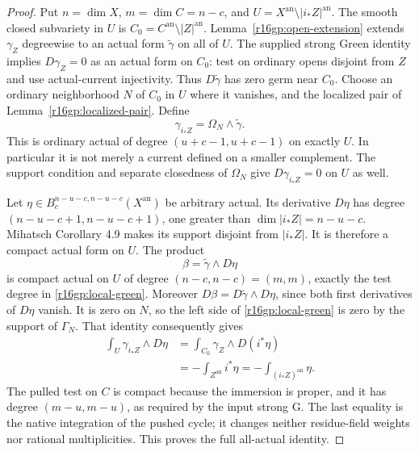\documentclass[11pt,a4paper]{article}
\theoremstyle{definition}
\theoremstyle{remark}
\numberwithin{equation}{section}
\begin{document}
\begin{proof}
Put $n=\dim X$, $m=\dim C=n-c$, and
$U=X^{\mathrm{an}}\setminus|i_*Z|^{\mathrm{an}}$.
The smooth closed subvariety in $U$ is
$C_0=C^{\mathrm{an}}\setminus|Z|^{\mathrm{an}}$.
Lemma~\ref{r16gp:open-extension} extends $\gamma_Z$ degreewise
to an actual form $\widetilde\gamma$ on all of $U$.
The supplied strong Green identity implies
$D\gamma_Z=0$ as an actual form on $C_0$: test on ordinary opens
disjoint from $Z$ and use actual-current injectivity.
Thus $D\widetilde\gamma$ has zero germ near $C_0$.
Choose an ordinary neighborhood $N$ of $C_0$ in $U$ where it
vanishes, and the localized pair of
Lemma~\ref{r16gp:localized-pair}.  Define
\[
                   \gamma_{i_*Z}=\Omega_N\wedge\widetilde\gamma.
 \tag{GP16.4}\label{r16gp:construction}
\]
This is ordinary actual of degree $(u+c-1,u+c-1)$ on exactly
$U$.  In particular it is not merely a current defined on a
smaller complement.  The support condition and separate closedness
of $\Omega_N$ give $D\gamma_{i_*Z}=0$ on $U$ as well.

Let $\eta\in B_c^{n-u-c,n-u-c}(X^{\mathrm{an}})$ be arbitrary
actual.  Its derivative $D\eta$ has degree
$(n-u-c+1,n-u-c+1)$, one greater than
$\dim|i_*Z|=n-u-c$.  Mihatsch Corollary 4.9 makes its support
disjoint from $|i_*Z|$.  It is therefore a compact actual form
on $U$.  The product
\[
                    \beta=\widetilde\gamma\wedge D\eta
\]
is compact actual on $U$ of degree $(n-c,n-c)=(m,m)$, exactly
the test degree in \eqref{r16gp:local-green}.  Moreover
$D\beta=D\widetilde\gamma\wedge D\eta$, since both first
derivatives of $D\eta$ vanish.  It is zero on $N$, so the
left side of \eqref{r16gp:local-green} is zero by the support
of $\Gamma_N$.  That identity consequently gives
\[
\begin{split}
 \int_U\gamma_{i_*Z}\wedge D\eta
  &=\int_{C_0}\gamma_Z\wedge D(i^*\eta)\\
  &=-\int_{Z^{\mathrm{an}}}i^*\eta
   =-\int_{(i_*Z)^{\mathrm{an}}}\eta.
\end{split}
 \tag{GP16.5}\label{r16gp:pairing}
\]
The pulled test on $C$ is compact because the immersion is proper,
and it has degree $(m-u,m-u)$, as required by the input strong G.
The last equality is the native integration of the pushed cycle;
it changes neither residue-field weights nor rational multiplicities.
This proves the full all-actual identity.
\end{proof}




\end{document}
